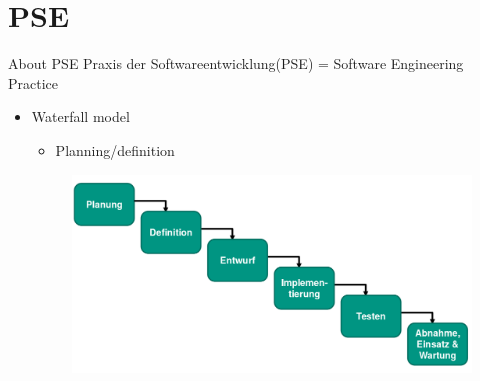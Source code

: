 \section{PSE}

\begin{frame}{About PSE}
	Praxis der Softwareentwicklung(PSE) = Software Engineering Practice
	\begin{itemize}
		\item Waterfall model
		 \begin{itemize} 
			\item Planning/definition
		\end{itemize}
		\begin{figure}[htb]
		    \centering
		      \includegraphics[width=.80\textwidth, height=.80\textheight, keepaspectratio]{./resources/wasserfallmodell.png}
		  \end{figure}
	\end{itemize}
\end{frame}
